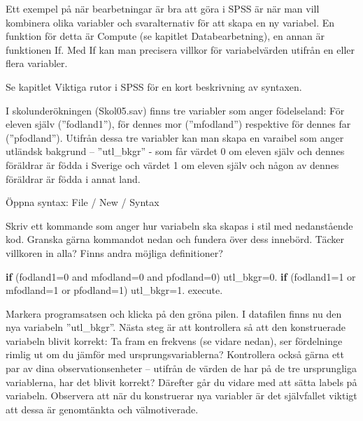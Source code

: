 \documentclass[
]{book}
\newenvironment{Shaded}{\begin{snugshade}}{\end{snugshade}}
\newcommand{\AttributeTok}[1]{\textcolor[rgb]{0.77,0.63,0.00}{#1}}
\newcommand{\ControlFlowTok}[1]{\textcolor[rgb]{0.13,0.29,0.53}{\textbf{#1}}}
\newcommand{\DecValTok}[1]{\textcolor[rgb]{0.00,0.00,0.81}{#1}}
\newcommand{\FloatTok}[1]{\textcolor[rgb]{0.00,0.00,0.81}{#1}}
\newcommand{\NormalTok}[1]{#1}
\newcommand{\OtherTok}[1]{\textcolor[rgb]{0.56,0.35,0.01}{#1}}
\begin{document}
Ett exempel på när bearbetningar är bra att göra i SPSS är när man vill kombinera olika variabler och
svaralternativ för att skapa en ny variabel. En funktion för detta är Compute (se kapitlet Databearbetning), en annan är funktionen If. Med If kan man precisera villkor för variabelvärden utifrån en eller flera variabler.

Se kapitlet Viktiga rutor i SPSS för en kort beskrivning av syntaxen.

I skolunderökningen (Skol05.sav) finns tre variabler som anger födelseland: För eleven själv
(''fodland1''), för dennes mor (''mfodland'') respektive för dennes far (''pfodland''). Utifrån dessa tre
variabler kan man skapa en varaibel som anger utländsk bakgrund -- ''utl\_bkgr'' - som får värdet 0 om
eleven själv och dennes föräldrar är födda i Sverige och värdet 1 om eleven själv och någon av dennes
föräldrar är födda i annat land.

Öppna syntax: File / New / Syntax

Skriv ett kommande som anger hur variabeln ska skapas i stil med nedanstående kod. Granska gärna kommandot nedan och fundera över dess innebörd. Täcker villkoren in alla? Finns andra möjliga definitioner?

\begin{Shaded}
\begin{Highlighting}[]
\ControlFlowTok{if}\NormalTok{ (}\AttributeTok{fodland1=}\DecValTok{0}\NormalTok{ and }\AttributeTok{mfodland=}\DecValTok{0}\NormalTok{ and }\AttributeTok{pfodland=}\DecValTok{0}\NormalTok{) utl\_bkgr}\OtherTok{=}\FloatTok{0.}
\ControlFlowTok{if}\NormalTok{ (}\AttributeTok{fodland1=}\DecValTok{1}\NormalTok{ or }\AttributeTok{mfodland=}\DecValTok{1}\NormalTok{ or }\AttributeTok{pfodland=}\DecValTok{1}\NormalTok{) utl\_bkgr}\OtherTok{=}\FloatTok{1.}
\NormalTok{execute.}
\end{Highlighting}
\end{Shaded}

Markera programsatsen och klicka på den gröna pilen. I datafilen finns nu den nya variabeln ''utl\_bkgr''. Nästa steg är att kontrollera så att den konstruerade
variabeln blivit korrekt: Ta fram en frekvens (se vidare nedan), ser fördelninge rimlig ut om du jämför
med ursprungsvariablerna? Kontrollera också gärna ett par av dina observationsenheter -- utifrån de
värden de har på de tre ursprungliga variablerna, har det blivit korrekt? Därefter går du vidare med att
sätta labels på variabeln. Observera att när du konstruerar nya variabler är det självfallet viktigt att dessa är genomtänkta och välmotiverade.
\end{document}

